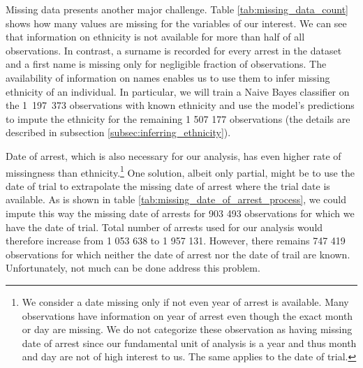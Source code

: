 
Missing data presents another major challenge. 
 Table \ref{tab:missing_data_count} shows how many values are missing for the variables of our interest. We can see that information on ethnicity is not available for more than half of all observations. In contrast, a surname is recorded for every arrest in the dataset and a first name is missing only for negligible fraction of observations. The availability of information on names enables us to use them to infer missing ethnicity of an individual. In particular, we will train a Naive Bayes classifier on the \mbox{1 197 373} observations with known ethnicity and use the model's predictions to impute the ethnicity for the remaining 1 507 177 observations (the details are described in subsection \ref{subsec:inferring_ethnicity}).


Date of arrest, which is also necessary for our analysis, has even higher rate of missingness than ethnicity.\footnote{
We consider a date missing only if not even year of arrest is available. Many observations have information on year of arrest even though the exact month or day are missing. We do not categorize these observation as having missing date of arrest since our fundamental unit of analysis is a year and thus month and day are not of high interest to us. The same applies to the date of trial.} 
One solution, albeit only partial, might be to use the date of trial    to extrapolate the missing date of arrest where the trial date is available.
As is shown in  table \ref{tab:missing_date_of_arrest_process}, we could impute this way the missing date of arrests for 903 493 observations for which we have the date of trial. 
Total number of arrests used for our analysis would therefore increase from 1 053 638 to  1 957 131.  However, there remains 747 419 observations for which neither the date of arrest nor the date of trail are known. 
Unfortunately, not much can be done address this problem.

%

